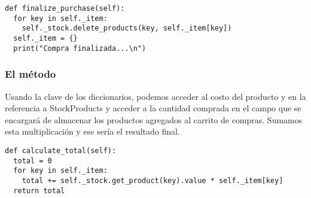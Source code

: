 \begin{verbatim}
def finalize_purchase(self):
  for key in self._item:
    self._stock.delete_products(key, self._item[key])
  self._item = {}
  print("Compra finalizada...\n")
\end{verbatim}

\subsubsection{El método }
Usando la clave de los diccionarios, podemos acceder al costo del producto y en la referencia a StockProducts y acceder a la cantidad comprada en el campo que se encargará de almacenar los productos agregados al carrito de compras. Sumamos esta multiplicación y ese sería el resultado final.

\begin{verbatim}
def calculate_total(self):
  total = 0
  for key in self._item:
    total += self._stock.get_product(key).value * self._item[key]
  return total
\end{verbatim}
